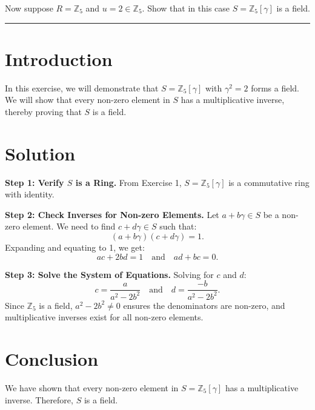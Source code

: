 \documentclass[12pt]{amsart}
\theoremstyle{definition}
\numberwithin{equation}{section}
\newcommand{\Z}{\mathbb{Z}}
\begin{document}
\begin{exercise}{2} Now suppose \(R = \Z_5 \) and \(u=2\in \Z_5 \). Show that in this case \(S=\Z_5[\gamma]\) is a field.

    \noindent\rule{\linewidth}{1pt}

    \section*{Introduction}
    In this exercise, we will demonstrate that \(S = \Z_5[\gamma]\) with \(\gamma^2 = 2\) forms a field. We will show that every non-zero element in \(S\) has a multiplicative inverse, thereby proving that \(S\) is a field.

    \section*{Solution}
    \noindent \textbf{Step 1: Verify \(S\) is a Ring.}
    From Exercise 1, \(S = \Z_5[\gamma]\) is a commutative ring with identity.

    \noindent \textbf{Step 2: Check Inverses for Non-zero Elements.}
    Let \(a + b\gamma \in S\) be a non-zero element. We need to find \(c + d\gamma \in S\) such that:
    \[
    (a + b\gamma)(c + d\gamma) = 1.
    \]
    Expanding and equating to 1, we get:
    \[
    ac + 2bd = 1 \quad \text{and} \quad ad + bc = 0.
    \]

    \noindent \textbf{Step 3: Solve the System of Equations.}
    Solving for \(c\) and \(d\):
    \[
    c = \frac{a}{a^2 - 2b^2} \quad \text{and} \quad d = \frac{-b}{a^2 - 2b^2}.
    \]
    Since \(\Z_5\) is a field, \(a^2 - 2b^2 \neq 0\) ensures the denominators are non-zero, and multiplicative inverses exist for all non-zero elements.

    \section*{Conclusion}
    We have shown that every non-zero element in \(S = \Z_5[\gamma]\) has a multiplicative inverse. Therefore, \(S\) is a field.

\end{exercise}
\newpage
\end{document}
